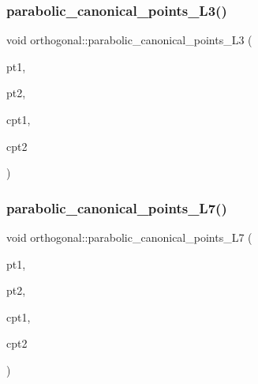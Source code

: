 \subsubsection{\texorpdfstring{parabolic\+\_\+canonical\+\_\+points\+\_\+\+L3()}{parabolic\_canonical\_points\_L3()}}
{\footnotesize\ttfamily void orthogonal\+::parabolic\+\_\+canonical\+\_\+points\+\_\+\+L3 (\begin{DoxyParamCaption}\item[{\mbox{\hyperlink{galois_8h_a09fddde158a3a20bd2dcadb609de11dc}{I\+NT}}}]{pt1,  }\item[{\mbox{\hyperlink{galois_8h_a09fddde158a3a20bd2dcadb609de11dc}{I\+NT}}}]{pt2,  }\item[{\mbox{\hyperlink{galois_8h_a09fddde158a3a20bd2dcadb609de11dc}{I\+NT}} \&}]{cpt1,  }\item[{\mbox{\hyperlink{galois_8h_a09fddde158a3a20bd2dcadb609de11dc}{I\+NT}} \&}]{cpt2 }\end{DoxyParamCaption})}

\mbox{\label{classorthogonal_a24a02b853a67fddf218aa24a185506eb}} 
\subsubsection{\texorpdfstring{parabolic\+\_\+canonical\+\_\+points\+\_\+\+L7()}{parabolic\_canonical\_points\_L7()}}
{\footnotesize\ttfamily void orthogonal\+::parabolic\+\_\+canonical\+\_\+points\+\_\+\+L7 (\begin{DoxyParamCaption}\item[{\mbox{\hyperlink{galois_8h_a09fddde158a3a20bd2dcadb609de11dc}{I\+NT}}}]{pt1,  }\item[{\mbox{\hyperlink{galois_8h_a09fddde158a3a20bd2dcadb609de11dc}{I\+NT}}}]{pt2,  }\item[{\mbox{\hyperlink{galois_8h_a09fddde158a3a20bd2dcadb609de11dc}{I\+NT}} \&}]{cpt1,  }\item[{\mbox{\hyperlink{galois_8h_a09fddde158a3a20bd2dcadb609de11dc}{I\+NT}} \&}]{cpt2 }\end{DoxyParamCaption})}

\mbox{\label{classorthogonal_ad6539385a01fde3384fa94fd4256ee38}} 
